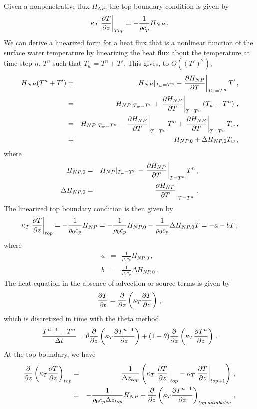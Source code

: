 \documentclass[12pt]{article}
\begin{document}
Given a nonpenetrative flux $H_{NP}$, the top boundary condition is given by
\[
\kappa_T\left.\frac{\partial{T}}{\partial{z}}\right|_{Top} = -\frac{1}{\rho c_p}H_{NP}\,.
\]
We can derive a linearized form for a heat flux that is a nonlinear function
of the surface water temperature by
linearizing the heat flux about the temperature at time step $n$, $T^n$
such that $T_w = T^n + T'$. This gives, to $O((T')^2)$,
\begin{eqnarray*}
H_{NP}(T^n  + T') &=& H_{NP}|_{T_w=T^n} + \left.\frac{\partial{H_{NP}}}{\partial{T}}\right|_{T_w=T^n}T'\,,\\
                       &=& H_{NP}|_{T_w=T^n} + \left.\frac{\partial{H_{NP}}}{\partial{T}}\right|_{T=T^n}\left(T_w - T^n\right)\,,\\
                       &=& H_{NP}|_{T_w=T^n} - \left.\frac{\partial{H_{NP}}}{\partial{T}}\right|_{T=T^n}T^n
                                             + \left.\frac{\partial{H_{NP}}}{\partial{T}}\right|_{T=T^n}T_w\,,\\
                       &=& H_{NP,0} + \Delta H_{NP,0} T_w\,,
\end{eqnarray*}
where 
\begin{eqnarray*}
H_{NP,0} &=& H_{NP}|_{T_w=T^n} - \left.\frac{\partial{H_{NP}}}{\partial{T}}\right|_{T=T^n}T^n\,,\\
\Delta H_{NP,0} &=& \left.\frac{\partial{H_{NP}}}{\partial{T}}\right|_{T=T^n}\,.
\end{eqnarray*}
The linearized top boundary condition is then given by
\[
\kappa_T\left.\frac{\partial{T}}{\partial{z}}\right|_{top} = -\frac{1}{\rho_0 c_p}H_{NP} = -\frac{1}{\rho_0 c_p}H_{NP,0} - \frac{1}{\rho_0 c_p}\Delta H_{NP,0} T = -a - b T\,,
\]
where 
\begin{eqnarray*}
a &=& \frac{1}{\rho_0 c_p}H_{NP,0}\,,\\
b &=& \frac{1}{\rho_0 c_p}\Delta H_{NP,0}\,.
\end{eqnarray*}
The heat equation in the absence of advection or source terms is given by
\[
\frac{\partial{T}}{\partial{t}} = \frac{\partial{}}{\partial{z}}\left(\kappa_T\frac{\partial{T}}{\partial{z}}\right)\,,
\]
which is discretized in time with the theta method
\[
\frac{T^{n+1} - T^n}{\Delta t} = \theta\frac{\partial{}}{\partial{z}}\left(\kappa_T\frac{\partial{T^{n+1}}}{\partial{z}}\right)
                              +(1-\theta)\frac{\partial{}}{\partial{z}}\left(\kappa_T\frac{\partial{T^{n}}}{\partial{z}}\right)\,.
\]
At the top boundary, we have
\begin{eqnarray*}
\frac{\partial{}}{\partial{z}}\left(\kappa_T\frac{\partial{T}}{\partial{z}}\right)_{top} &=&
\frac{1}{\Delta z_{top}}\left(\kappa_T\left.\frac{\partial{T}}{\partial{z}}\right|_{top} 
- \kappa_T\left.\frac{\partial{T}}{\partial{z}}\right|_{top+1}\right)\,,\\
                                     &=&
-\frac{1}{\rho_0 c_p \Delta z_{top}}H_{NP}
+\frac{\partial{}}{\partial{z}}\left(\kappa_T\frac{\partial{T^{n+1}}}{\partial{z}}\right)_{top,adiabatic}\,,
\end{eqnarray*}
\end{document}

